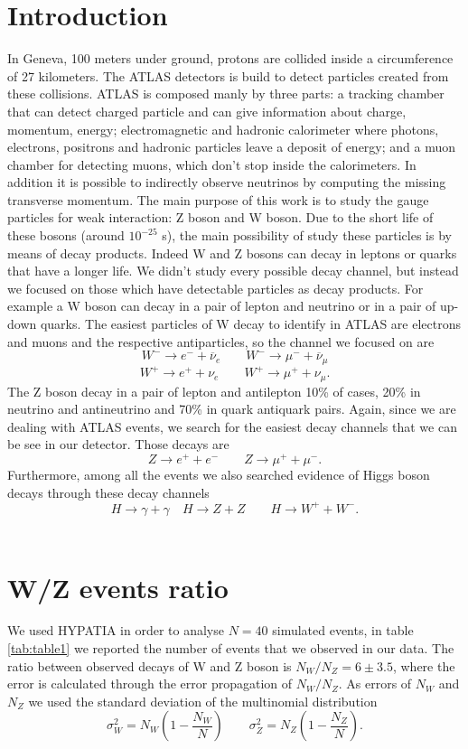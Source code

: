 \documentclass[%
 reprint,
 amsmath,amssymb,
 aps,
]{revtex4-1}
\begin{document}
\section{\label{sec:level1}Introduction}
In Geneva, 100 meters under ground, protons are collided inside a circumference of 27 kilometers. The ATLAS detectors is build to detect particles created from these collisions.
ATLAS is composed manly by three parts: a tracking chamber that can detect charged particle and can give information about charge, momentum, energy; electromagnetic and hadronic calorimeter where photons, electrons, positrons and hadronic particles leave a deposit of energy; and a muon chamber for detecting muons, which don't stop inside the calorimeters. In addition it is possible to indirectly observe neutrinos by computing the missing transverse momentum. The main purpose of this work is to study the gauge particles for weak interaction: Z boson and W boson. Due to the short life of these bosons (around $10^{-25}$ s), the main possibility of study these particles is by means of decay products. Indeed W and Z bosons can decay in leptons or quarks that have a longer life. We didn't study every possible decay channel, but instead we focused on those which have detectable particles as decay products. For example a W boson can decay in a pair of lepton and neutrino or in a pair of up-down quarks. The easiest particles of W decay to identify in ATLAS are electrons and muons and the respective antiparticles, so the channel we focused on are
\[W^- \to e^- + \overline{\nu}_e \qquad W^- \to \mu^- + \overline{\nu}_\mu\]
\[W^+ \to e^+ + \nu_e \qquad W^+ \to \mu^+ + \nu_\mu. \]
The Z boson decay in a pair of lepton and antilepton 10\% of cases, 20\% in neutrino and antineutrino and 70\% in quark antiquark pairs. Again, since we are dealing with ATLAS events, we search for the easiest decay channels that we can be see in our detector. Those decays are
\[Z \to e^+ + e^- \qquad Z \to \mu^+ + \mu^-.\]
Furthermore, among all the events we also searched evidence of Higgs boson decays through these decay channels
\[H \to \gamma + \gamma \quad H \to Z+ Z \qquad H \to W^+ + W^-.\]
\\


\section{W/Z events ratio}
We used HYPATIA in order to analyse $N=40$ simulated events, in table \ref{tab:table1} we reported the number of events that we observed in our data.
The ratio between observed decays of W and Z boson is $ N_W/N_Z = 6\pm 3.5$, where the error is calculated through the error propagation of $N_W/N_Z$. As errors of $N_W$ and $N_Z$ we used the standard deviation of the multinomial distribution
\[\sigma_W^2 =  N_W\left(1-\frac{N_W}{N}\right) \qquad \sigma_Z^2 =  N_Z\left(1-\frac{N_Z}{N}\right).\]
\end{document}
